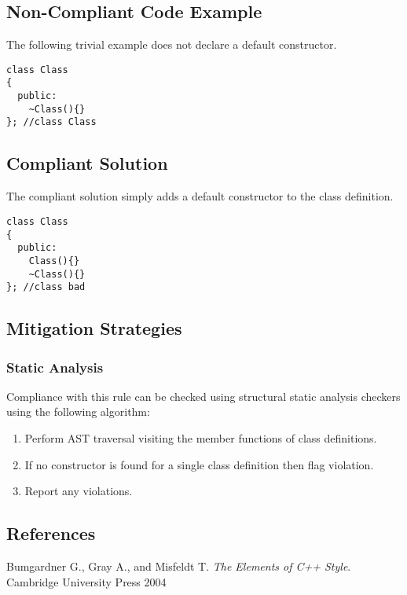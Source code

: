 \subsection{Non-Compliant Code Example}
The following trivial example does not declare a default constructor.

\begin{verbatim}
class Class
{
  public:
    ~Class(){}
}; //class Class
\end{verbatim}

\subsection{Compliant Solution}
The compliant solution simply adds a default constructor to the class definition.

\begin{verbatim}
class Class
{
  public:
    Class(){}
    ~Class(){}
}; //class bad
\end{verbatim}

\subsection{Mitigation Strategies}
\subsubsection{Static Analysis} 

Compliance with this rule can be checked using structural static analysis checkers using the following algorithm:

\begin{enumerate}
\item Perform AST traversal visiting the member functions of class definitions.
\item If no constructor is found for a single class definition then flag violation.
\item Report any violations.
\end{enumerate}

\subsection{References}

Bumgardner G., Gray A., and Misfeldt T. {\it The Elements of C++ Style}. Cambridge University Press 2004
